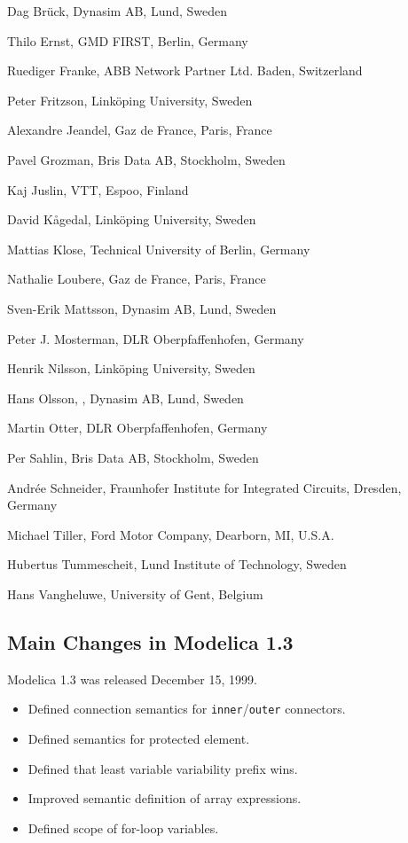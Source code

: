 Dag Brück, Dynasim AB, Lund, Sweden

Thilo Ernst, GMD FIRST, Berlin, Germany

Ruediger Franke, ABB Network Partner Ltd. Baden, Switzerland

Peter Fritzson, Linköping University, Sweden

Alexandre Jeandel, Gaz de France, Paris, France

Pavel Grozman, Bris Data AB, Stockholm, Sweden

Kaj Juslin, VTT, Espoo, Finland

David Kågedal, Linköping University, Sweden

Mattias Klose, Technical University of Berlin, Germany

Nathalie Loubere, Gaz de France, Paris, France

Sven-Erik Mattsson, Dynasim AB, Lund, Sweden

Peter J. Mosterman, DLR Oberpfaffenhofen, Germany

Henrik Nilsson, Linköping University, Sweden

Hans Olsson, , Dynasim AB, Lund, Sweden

Martin Otter, DLR Oberpfaffenhofen, Germany

Per Sahlin, Bris Data AB, Stockholm, Sweden

Andrée Schneider, Fraunhofer Institute for Integrated Circuits, Dresden,
Germany

Michael Tiller, Ford Motor Company, Dearborn, MI, U.S.A.

Hubertus Tummescheit, Lund Institute of Technology, Sweden

Hans Vangheluwe, University of Gent, Belgium

\subsection{Main Changes in Modelica 1.3}\label{main-changes-in-modelica-1-3}

Modelica 1.3 was released December 15, 1999.
\begin{itemize}
\item
  Defined connection semantics for \lstinline!inner!/\lstinline!outer! connectors.
\item
  Defined semantics for protected element.
\item
  Defined that least variable variability prefix wins.
\item
  Improved semantic definition of array expressions.
\item
  Defined scope of for-loop variables.
\end{itemize}

